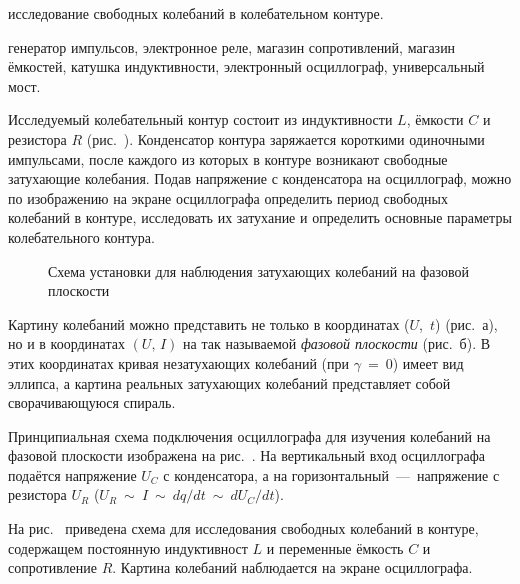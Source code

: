 
\begin{lab:aim}
исследование свободных колебаний в колебательном контуре.
\end{lab:aim}

\begin{lab:equipment}
генератор импульсов, электронное реле, магазин сопротивлений, магазин ёмкостей,
катушка индуктивности, электронный осциллограф, универсальный мост.
\end{lab:equipment}

Исследуемый колебательный контур состоит из индуктивности $L$, ёмкости $C$ и
резистора $R$ (рис.~). Конденсатор контура заряжается короткими
одиночными импульсами, после каждого из которых в контуре возникают свободные
затухающие колебания. Подав напряжение с конденсатора на осциллограф, можно по
изображению на экране осциллографа определить период свободных колебаний в
контуре, исследовать их затухание и определить основные параметры колебательного
контура.

\begin{wrapfigure}[15]{r}{0.45\linewidth}
	\caption{Схема установки для наблюдения затухающих колебаний на фазовой
плоскости}
\end{wrapfigure}

Картину колебаний можно представить не только в координатах ($U$,~$t$)
(рис.~а), 
но и в координатах $(U,\,I)$ на так называемой \emph{фазовой плоскости} 
(рис.~б). В этих координатах кривая
незатухающих колебаний (при $\gamma~=~0$) имеет вид эллипса, а картина реальных
затухающих колебаний представляет собой сворачивающуюся спираль.

Принципиальная схема подключения осциллографа для изучения колебаний на фазовой
плоскости изображена на рис.~. На вертикальный вход
осциллографа подаётся напряжение $U_C$ с конденсатора, а на
горизонтальный~---~напряжение с резистора $U_R$ ($U_R ~ {\sim} ~ I~  {\sim}~
dq/dt ~ {\sim}~  dU_C/dt$).

\experiment  На рис.~ приведена схема для исследования
свободных колебаний в контуре, содержащем постоянную индуктивност $L$ и
переменные ёмкость $C$ и сопротивление $R$. Картина колебаний наблюдается на
экране осциллографа.


